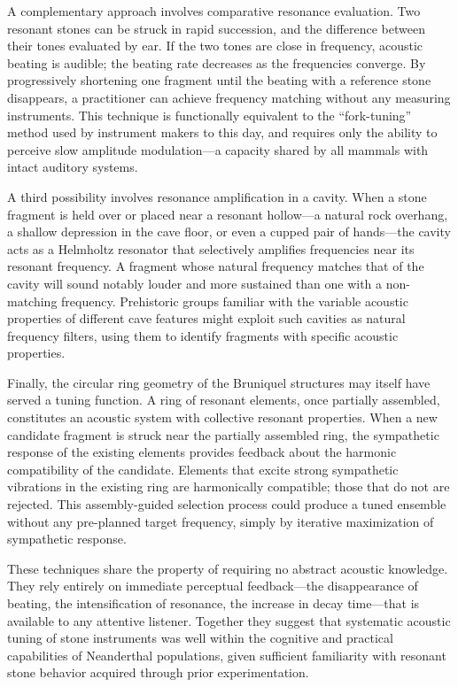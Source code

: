 \documentclass[12pt]{article}
\begin{document}
A complementary approach involves comparative resonance evaluation. Two resonant stones can be struck in rapid succession, and the difference between their tones evaluated by ear. If the two tones are close in frequency, acoustic beating is audible; the beating rate decreases as the frequencies converge. By progressively shortening one fragment until the beating with a reference stone disappears, a practitioner can achieve frequency matching without any measuring instruments. This technique is functionally equivalent to the ``fork-tuning'' method used by instrument makers to this day, and requires only the ability to perceive slow amplitude modulation—a capacity shared by all mammals with intact auditory systems.

A third possibility involves resonance amplification in a cavity. When a stone fragment is held over or placed near a resonant hollow—a natural rock overhang, a shallow depression in the cave floor, or even a cupped pair of hands—the cavity acts as a Helmholtz resonator that selectively amplifies frequencies near its resonant frequency. A fragment whose natural frequency matches that of the cavity will sound notably louder and more sustained than one with a non-matching frequency. Prehistoric groups familiar with the variable acoustic properties of different cave features might exploit such cavities as natural frequency filters, using them to identify fragments with specific acoustic properties.

Finally, the circular ring geometry of the Bruniquel structures may itself have served a tuning function. A ring of resonant elements, once partially assembled, constitutes an acoustic system with collective resonant properties. When a new candidate fragment is struck near the partially assembled ring, the sympathetic response of the existing elements provides feedback about the harmonic compatibility of the candidate. Elements that excite strong sympathetic vibrations in the existing ring are harmonically compatible; those that do not are rejected. This assembly-guided selection process could produce a tuned ensemble without any pre-planned target frequency, simply by iterative maximization of sympathetic response.

These techniques share the property of requiring no abstract acoustic knowledge. They rely entirely on immediate perceptual feedback—the disappearance of beating, the intensification of resonance, the increase in decay time—that is available to any attentive listener. Together they suggest that systematic acoustic tuning of stone instruments was well within the cognitive and practical capabilities of Neanderthal populations, given sufficient familiarity with resonant stone behavior acquired through prior experimentation.
\end{document}

